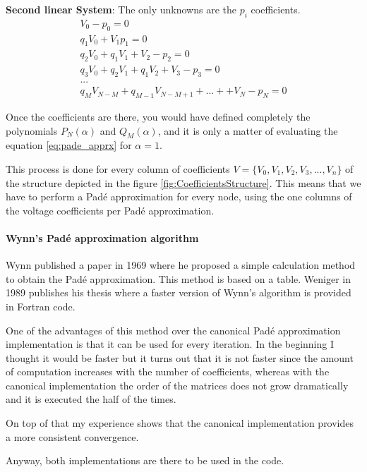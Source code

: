\documentclass[nols,a4paper,twoside,symmetric,notoc,fleqn]{tufte-book}
\begin{document}
\textbf{Second linear System}: The only unknowns are the $p_i$ coefficients.
\begin{equation}
\begin{matrix}
V_0 - p_0=0\\
q_1V_0 + V_1  p_1=0\\
q_2V_0 + q_1V_1+V_2-p_2=0\\
q_3V_0 + q_2V_1 + q_1V_2 + V_3 - p_3 = 0\\
...\\
q_MV_{N-M} + q_{M-1}V_{N-M+1} + ... + +V_N - p_N=0
\end{matrix}
\end{equation}

Once the coefficients are there, you would have defined completely the polynomials $P_N(\alpha)$ and $Q_M(\alpha)$, and it is only a matter of evaluating the equation \ref{eq:pade_apprx} for $\alpha=1$.\newline


This process is done for every column of coefficients ${V}=\{V_0, V_1,V_2,V_3, ...,V_n\}$ of the structure depicted in the figure \ref{fig:CoefficientsStructure}. This means that we have to perform a Pad\'e approximation for every node, using the one columns of the voltage coefficients per Pad\'e approximation.

\paragraph{Wynn's Pad\'e approximation algorithm}

Wynn published a paper in 1969 where he proposed a simple calculation method to obtain the Pad\'e approximation. This method is based on a table. Weniger in 1989 publishes his thesis where a faster version of Wynn's algorithm is provided in Fortran code. 


One of the advantages of this method over the canonical Pad\'e approximation implementation is that it can be used for every iteration. In the beginning I thought it would be faster but it turns out that it is not faster since the amount of computation increases with the number of coefficients, whereas with the canonical implementation the order of the matrices does not grow dramatically and it is executed the half of the times.

On top of that my experience shows that the canonical implementation provides a more consistent convergence.

Anyway, both implementations are there to be used in the code.
\end{document}
